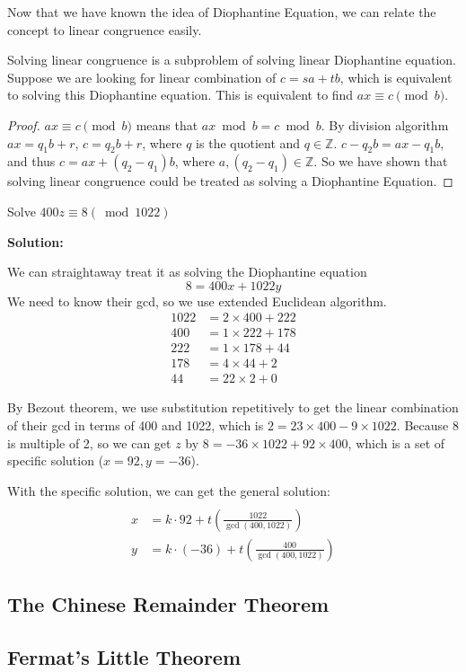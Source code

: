 Now that we have known the idea of Diophantine Equation, we can relate the concept to linear
congruence easily. 
\begin{proposition}
    Solving linear congruence is a subproblem of solving linear Diophantine equation.
    Suppose we are looking for linear combination of $c=sa+tb$, which is equivalent
to solving this Diophantine equation. This is equivalent to find $ax\equiv c \pmod b$.
\end{proposition}
\begin{proof}
    $ax\equiv c \pmod b$ means that $ax \bmod b = c \bmod b$. By division algorithm
    $ax = q_1b + r$, $c = q_2b + r$, where $q$ is the quotient and $q\in \mathbb{Z}$. 
    $c-q_2b = ax-q_1b$, and thus $c = ax + (q_2-q_1)b$, where $a, (q_2-q_1)\in \mathbb{Z}$.
    So we have shown that solving linear congruence could be treated as solving a Diophantine Equation.
\end{proof}
\begin{example}
    Solve $400z\equiv 8 (\bmod1022)$
\end{example}
\textbf{Solution:} 

    We can straightaway treat it as solving the Diophantine equation
    $$8 = 400x + 1022y$$
    We need to know their gcd, so we use extended Euclidean algorithm.
   $$ \begin{aligned}
        1022&=2\times400+222\\
        400&=1\times 222+178\\
        222&=1\times 178+44\\
        178&=4\times 44+2\\
        44&=22\times2+0
        \end{aligned}$$
    
        By Bezout theorem, we use substitution repetitively to get the linear combination of
        their gcd in terms of 400 and 1022, which is $2 = 23\times 400 -9\times 1022$.
        Because 8 is multiple of 2, so we can get $z$ by $8 = -36\times 1022 + 92\times 400$, 
        which is a set of specific solution ($x = 92, y=-36$).

        With the specific solution, we can get the general solution:
        $$ \begin{aligned}\\
            x&=k\cdot 92+t(\frac{1022}{\gcd(400,1022)})\\
            y&=k\cdot(-36)+t(\frac{400}{\gcd(400,1022)} )
            \end{aligned}$$
        
        \subsection{The Chinese Remainder Theorem}
        \subsection{Fermat's Little Theorem}
